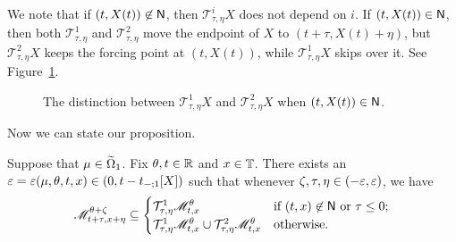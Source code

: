 \documentclass[AHL,Unicode,longabstracts]{cedram}
\newcounter{setofcase}
\newcounter{case}[setofcase]
\newcommand*\ssN{\mathsf{N}}
\newcommand*\scM{\mathscr{M}}
\newcommand*\TT{\mathbb{T}}
\newcommand*\RR{\mathbb{R}}
\newcommand{\clT}{\mathcal{T}}
\newcommand*\eps{\varepsilon}
\let\oldin\in
\renewcommand{\in}{\mathchoice{\oldin}{\oldin}{\,\oldin\,}{\,\oldin\,}}
\newcommand*\TT{\mathbb{T}}
\newcommand*\RR{\mathbb{R}}
\begin{document}
We note that if $(t,X(t))\not\in\ssN$, then $\clT_{\tau,\eta}^{i}X$ does not depend on $i$. If $(t,X(t))\in\ssN$, then both $\clT_{\tau,\eta}^{1}$ and $\clT_{\tau,\eta}^{2}$ move the endpoint of $X$ to $(t+\tau,X(t)+\eta)$, but $\clT_{\tau,\eta}^{2}X$ keeps the forcing point at $(t,X(t))$, while $\clT_{\tau,\eta}^{1}X$ skips over it. See Figure~\ref{fig:move_endpoint_picture}.


\begin{figure}[!htbp]
\begin{centering}

\end{centering}
\caption[Distinction between different notions of perturbing a minimizer]{The distinction between $\clT_{\tau,\eta}^{1}X$ and $\clT_{\tau,\eta}^{2}X$ when $(t,X(t))\in\protect\ssN$.}
\label{fig:move_endpoint_picture}
\end{figure}

Now we can state our proposition.

\begin{prop}\label{prop:main-continuity}
Suppose that $\mu\in\widetilde{\Omega}_{1}$. Fix $\theta,t\in\RR$ and $x\in\TT$. There exists an $\eps=\eps(\mu,\theta,t,x)\in(0,t-t_{-;1}[X])$ such that whenever $\zeta,\tau,\eta\in(-\eps,\eps)$, we have
\begin{equation}\label{eq:main-continuity}
\scM_{t+\tau,x+\eta}^{\theta+\zeta}\subseteq
\begin{cases}
\clT_{\tau,\eta}^{1}\scM_{t,x}^{\theta} & \text{if }(t,x)\not\in\ssN\text{ or }\tau\le0;\\
\clT_{\tau,\eta}^{1}\scM_{t,x}^{\theta}\cup\clT_{\tau,\eta}^{2}\scM_{t,x}^{\theta} & \text{otherwise.}
\end{cases}
\end{equation}
\end{prop}
\end{document}
